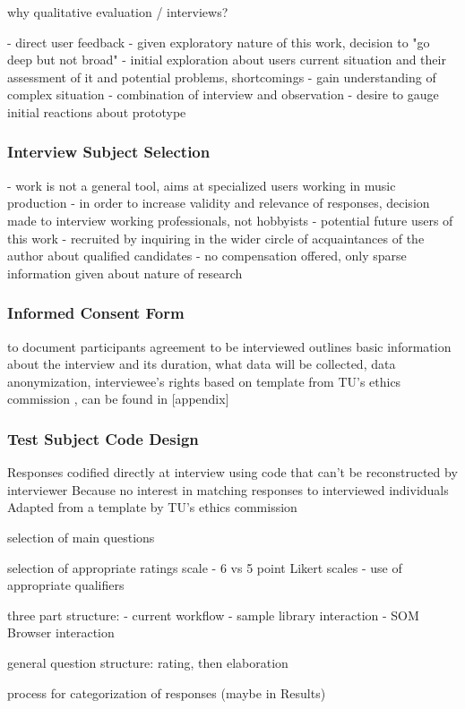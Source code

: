 why qualitative evaluation / interviews?

- direct user feedback
- given exploratory nature of this work, decision to "go deep but not
broad"
- initial exploration about users current situation and their assessment
of it and potential problems, shortcomings
- gain understanding of complex situation
- combination of interview and observation
- desire to gauge initial reactions about prototype

\bigskip


\subsubsection{Interview Subject Selection}
\label{subsubsec:subject_selection}

- work is not a general tool, aims at specialized users working in music
production
- in order to increase validity and relevance of responses, decision made
to interview working professionals, not hobbyists
- potential future users of this work
- recruited by inquiring in the wider circle
of acquaintances of the author about qualified candidates
- no compensation offered, only sparse information given about nature of
research

\subsubsection{Informed Consent Form}
\label{subsubsec:consent_form}

to document participants agreement to be interviewed
outlines basic information about the interview and its duration, what data will
be collected, data anonymization, interviewee's rights
based on template from TU's ethics commission \citep{web:ethics2019}, can be
found in [appendix]

\subsubsection{Test Subject Code Design}
\label{subsubsec:subject_code}

Responses codified directly at interview using code that can't be reconstructed
by interviewer
Because no interest in matching responses to interviewed individuals
Adapted from a template by TU's ethics commission \citep{web:ethics2019}

\bigskip
selection of main questions

\bigskip
selection of appropriate ratings scale
- 6 vs 5 point Likert scales
- use of appropriate qualifiers

\bigskip
three part structure:
- current workflow
- sample library interaction
- SOM Browser interaction

general question structure: rating, then elaboration

\bigskip
process for categorization of responses (maybe in Results)
